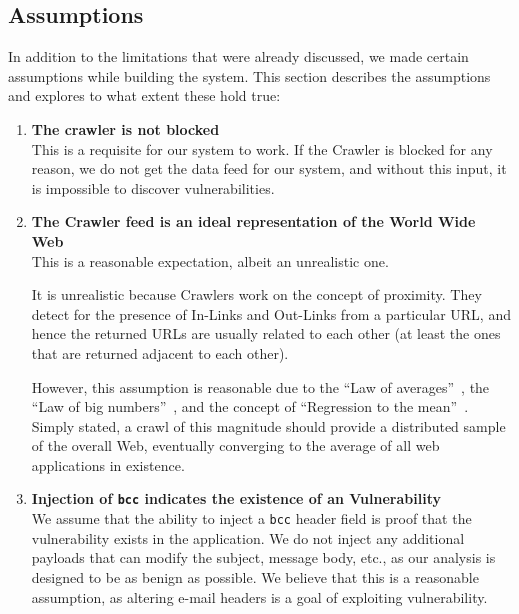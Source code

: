 \subsection{Assumptions}
In addition to the limitations that were already discussed, we made certain assumptions while building the system. This section describes the assumptions and explores to what extent these hold true:
\begin{enumerate}
	\item \textbf{The crawler is not blocked}\\
	This is a requisite for our system to work. If the Crawler is blocked for any reason, we do not get the data feed for our system, and without this input, it is impossible to discover vulnerabilities. 
	
	\item \textbf{The Crawler feed is an ideal representation of the World Wide Web} \\
	This is a reasonable expectation, albeit an unrealistic one.

	It is unrealistic because Crawlers work on the concept of proximity. They detect for the presence of In-Links and Out-Links from a particular URL, and hence the returned URLs are usually related to each other (at least the ones that are returned adjacent to each other).
	
	However, this assumption is reasonable due to the ``Law of averages''~\cite{wiki:Law_of_averages}, the ``Law of big numbers''~\cite{wiki:Law_of_large_numbers}, and the concept of ``Regression to the mean''~\cite{wiki:Regression_toward_the_mean}. Simply stated, a crawl of this magnitude should provide a distributed sample of the overall Web, eventually converging to the average of all web applications in existence.
	
	\item \textbf{Injection of \texttt{bcc} indicates the existence of an \ehi Vulnerability} \\
	We assume that the ability to inject a \texttt{bcc} header field is proof that the \ehi vulnerability exists in the application. We do not inject any additional payloads that can modify the subject, message body, etc., as our analysis is designed to be as benign as possible.
	We believe that this is a reasonable assumption, as altering e-mail headers is a goal of exploiting \ehi vulnerability.
\end{enumerate}
